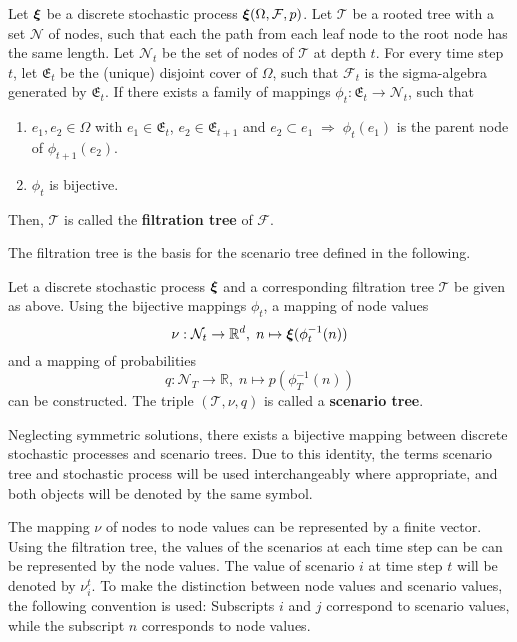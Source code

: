 \begin{definition}
  \label{def:filtration_tree}
  Let $\boldsymbol\xi$ be a discrete stochastic process $\boldsymbol\xi(\Omega, \mathcal{F}, p)$.
  Let $\mathcal{T}$ be a rooted tree with a set $\mathcal{N}$ of nodes, such that each the path from each leaf node to the root node has the same length.
  Let $\mathcal{N}_t$ be the set of nodes of $\mathcal{T}$ at depth $t$.
  For every time step $t$, let $\mathfrak{E}_t$ be the (unique) disjoint cover of $\Omega$, such that $\mathcal{F}_t$ is the sigma-algebra generated by $\mathfrak{E}_t$.
  If there exists a family of mappings $\phi_t:\mathfrak{E}_t\rightarrow \mathcal{N}_t$, such that
  \begin{enumerate}
  \item  $e_1,e_2\in\Omega$ with $e_1\in\mathfrak{E}_t$, $e_2\in\mathfrak{E}_{t+1}$ and $e_2\subset e_1\;\Rightarrow\;\phi_t(e_1)$ is the parent node of $\phi_{t+1}(e_2)$.
  \item $\phi_t$ is bijective.
  \end{enumerate}
  Then, $\mathcal{T}$ is called the \textbf{filtration tree} of $\mathcal{F}$.
\end{definition}
The filtration tree is the basis for the scenario tree defined in the following.
\begin{definition}
  Let a discrete stochastic process $\boldsymbol\xi$ and a corresponding filtration tree $\mathcal{T}$ be given as above.
  Using the bijective mappings $\phi_t$, a mapping of node values
  \[
  \nu:\mathcal{N}_t\rightarrow\mathbb{R}^d,\; n\mapsto \boldsymbol\xi(\phi_t^{-1}(n))
  \]
  and a mapping of probabilities
  \[
  q:\mathcal{N}_T\rightarrow\mathbb{R},\; n\mapsto p(\phi_T^{-1}(n))
  \]
  can be constructed.
  The triple $(\mathcal{T}, \nu, q)$ is called a \textbf{scenario tree}.
\end{definition}
Neglecting symmetric solutions, there exists a bijective mapping between discrete stochastic processes and scenario trees.
Due to this identity, the terms scenario tree and stochastic process will be used interchangeably where appropriate, and both objects will be denoted by the same symbol.
\begin{remark}
The mapping $\nu$ of nodes to node values can be represented by a finite vector.
Using the filtration tree, the values of the scenarios at each time step can be can be represented by the node values.
The value of scenario $i$ at time step $t$ will be denoted by $\nu_i^t$. To make the distinction between node values and scenario values, the following convention is used: Subscripts $i$ and $j$ correspond to scenario values, while the subscript $n$ corresponds to node values.
\end{remark}

